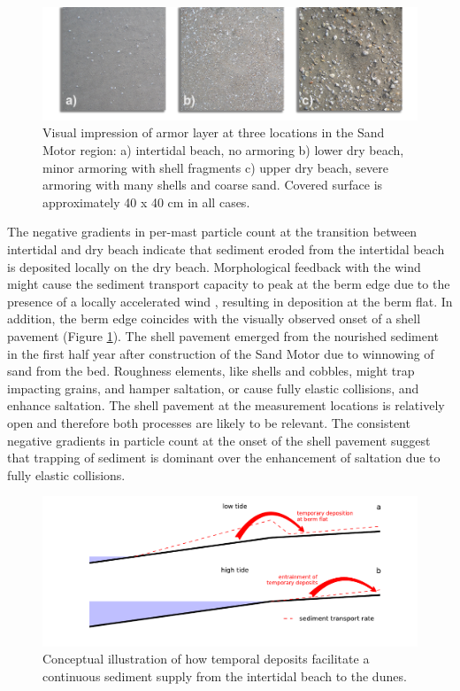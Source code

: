 \begin{figure}
  \centering
  \includegraphics[width=\columnwidth]{../Figures/armoring_small}
  \caption{Visual impression of armor layer at three locations in the
    Sand Motor region: a) intertidal beach, no armoring b) lower dry
    beach, minor armoring with shell fragments c) upper dry beach,
    severe armoring with many shells and coarse sand. Covered surface
    is approximately 40 x 40 cm in all cases.}
  \label{fig:armoring}
\end{figure}

The negative gradients in per-mast particle count at the transition
between intertidal and dry beach indicate that sediment eroded from
the intertidal beach is deposited locally on the dry
beach. Morphological feedback with the wind might cause the sediment
transport capacity to peak at the berm edge due to the presence of a
locally accelerated wind \citep[i.e. jet flow;][]{Hesp2016}, resulting
in deposition at the berm flat. In addition, the berm edge coincides
with the visually observed onset of a shell pavement (Figure
\ref{fig:armoring}). The shell pavement emerged from the nourished
sediment in the first half year after construction of the Sand Motor
\citep{Hoonhout2017a} due to winnowing of sand from the bed. Roughness
elements, like shells and cobbles, might trap impacting grains, and
hamper saltation, or cause fully elastic collisions, and enhance
saltation. The shell pavement at the measurement locations is
relatively open and therefore both processes are likely to be
relevant. The consistent negative gradients in particle count at the
onset of the shell pavement suggest that trapping of sediment is
dominant over the enhancement of saltation due to fully elastic
collisions.

\begin{figure}
 \centering
  \includegraphics[width=\columnwidth]{../Figures/temporal_deposits}
  \caption{Conceptual illustration of how temporal deposits facilitate
    a continuous sediment supply from the intertidal beach to the
    dunes.}
  \label{fig:temporal_deposits}
\end{figure}

